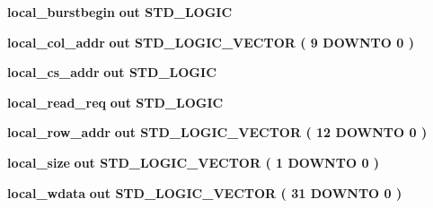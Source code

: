 \begin{DoxyCompactItemize}
\item 
{\bf local\+\_\+burstbegin}  {\bfseries {\bfseries \textcolor{keywordflow}{out}\textcolor{vhdlchar}{ }}} {\bfseries \textcolor{comment}{S\+T\+D\+\_\+\+L\+O\+G\+IC}\textcolor{vhdlchar}{ }} 
\item 
{\bf local\+\_\+col\+\_\+addr}  {\bfseries {\bfseries \textcolor{keywordflow}{out}\textcolor{vhdlchar}{ }}} {\bfseries \textcolor{comment}{S\+T\+D\+\_\+\+L\+O\+G\+I\+C\+\_\+\+V\+E\+C\+T\+OR}\textcolor{vhdlchar}{ }\textcolor{vhdlchar}{(}\textcolor{vhdlchar}{ }\textcolor{vhdlchar}{ } \textcolor{vhdldigit}{9} \textcolor{vhdlchar}{ }\textcolor{keywordflow}{D\+O\+W\+N\+TO}\textcolor{vhdlchar}{ }\textcolor{vhdlchar}{ } \textcolor{vhdldigit}{0} \textcolor{vhdlchar}{ }\textcolor{vhdlchar}{)}\textcolor{vhdlchar}{ }} 
\item 
{\bf local\+\_\+cs\+\_\+addr}  {\bfseries {\bfseries \textcolor{keywordflow}{out}\textcolor{vhdlchar}{ }}} {\bfseries \textcolor{comment}{S\+T\+D\+\_\+\+L\+O\+G\+IC}\textcolor{vhdlchar}{ }} 
\item 
{\bf local\+\_\+read\+\_\+req}  {\bfseries {\bfseries \textcolor{keywordflow}{out}\textcolor{vhdlchar}{ }}} {\bfseries \textcolor{comment}{S\+T\+D\+\_\+\+L\+O\+G\+IC}\textcolor{vhdlchar}{ }} 
\item 
{\bf local\+\_\+row\+\_\+addr}  {\bfseries {\bfseries \textcolor{keywordflow}{out}\textcolor{vhdlchar}{ }}} {\bfseries \textcolor{comment}{S\+T\+D\+\_\+\+L\+O\+G\+I\+C\+\_\+\+V\+E\+C\+T\+OR}\textcolor{vhdlchar}{ }\textcolor{vhdlchar}{(}\textcolor{vhdlchar}{ }\textcolor{vhdlchar}{ } \textcolor{vhdldigit}{12} \textcolor{vhdlchar}{ }\textcolor{keywordflow}{D\+O\+W\+N\+TO}\textcolor{vhdlchar}{ }\textcolor{vhdlchar}{ } \textcolor{vhdldigit}{0} \textcolor{vhdlchar}{ }\textcolor{vhdlchar}{)}\textcolor{vhdlchar}{ }} 
\item 
{\bf local\+\_\+size}  {\bfseries {\bfseries \textcolor{keywordflow}{out}\textcolor{vhdlchar}{ }}} {\bfseries \textcolor{comment}{S\+T\+D\+\_\+\+L\+O\+G\+I\+C\+\_\+\+V\+E\+C\+T\+OR}\textcolor{vhdlchar}{ }\textcolor{vhdlchar}{(}\textcolor{vhdlchar}{ }\textcolor{vhdlchar}{ } \textcolor{vhdldigit}{1} \textcolor{vhdlchar}{ }\textcolor{keywordflow}{D\+O\+W\+N\+TO}\textcolor{vhdlchar}{ }\textcolor{vhdlchar}{ } \textcolor{vhdldigit}{0} \textcolor{vhdlchar}{ }\textcolor{vhdlchar}{)}\textcolor{vhdlchar}{ }} 
\item 
{\bf local\+\_\+wdata}  {\bfseries {\bfseries \textcolor{keywordflow}{out}\textcolor{vhdlchar}{ }}} {\bfseries \textcolor{comment}{S\+T\+D\+\_\+\+L\+O\+G\+I\+C\+\_\+\+V\+E\+C\+T\+OR}\textcolor{vhdlchar}{ }\textcolor{vhdlchar}{(}\textcolor{vhdlchar}{ }\textcolor{vhdlchar}{ } \textcolor{vhdldigit}{31} \textcolor{vhdlchar}{ }\textcolor{keywordflow}{D\+O\+W\+N\+TO}\textcolor{vhdlchar}{ }\textcolor{vhdlchar}{ } \textcolor{vhdldigit}{0} \textcolor{vhdlchar}{ }\textcolor{vhdlchar}{)}\textcolor{vhdlchar}{ }} 

\end{DoxyCompactItemize}
